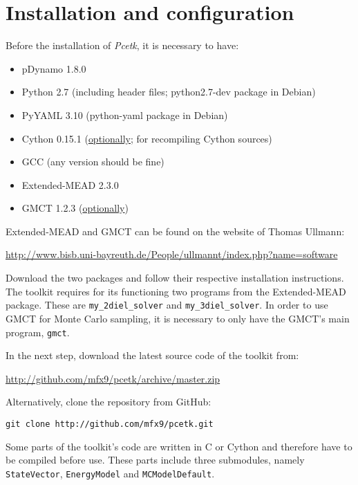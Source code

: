 \documentclass[12pt]{article}
\newcommand{\modulename}{\textit{Pcetk}\xspace}
\begin{document}
\section{Installation and configuration}
Before the installation of \modulename, it is necessary
to have:
\begin{itemize}
\itemsep0pt
  \item pDynamo 1.8.0
  \item Python 2.7 (including header files; python2.7-dev package in Debian)
  \item PyYAML 3.10 (python-yaml package in Debian)
  \item Cython 0.15.1 (\underline{optionally}; for recompiling Cython sources)
  \item GCC (any version should be fine)
  \item Extended-MEAD 2.3.0
  \item GMCT 1.2.3 (\underline{optionally})
\end{itemize}
%
Extended-MEAD and GMCT can be found on the website of Thomas Ullmann:

\url{http://www.bisb.uni-bayreuth.de/People/ullmannt/index.php?name=software}

Download the two packages and follow their respective installation
instructions.
%
The toolkit requires for its functioning two programs
from the Extended-MEAD package.
%
These are \texttt{my\_2diel\_solver} and \texttt{my\_3diel\_solver}.
%
In order to use GMCT for Monte Carlo sampling,
it is necessary to only have the
GMCT's main program, \texttt{gmct}.

\bigskip
In the next step,
download the latest source code of the toolkit from:

\url{http://github.com/mfx9/pcetk/archive/master.zip}

Alternatively,
clone the repository from GitHub:
%

{\footnotesize \singlespacing \begin{lstlisting}
git clone http://github.com/mfx9/pcetk.git
\end{lstlisting} }

\bigskip
Some parts of the toolkit's code are written in C or Cython and therefore have
to be compiled before use.
%
These parts include three submodules,
namely {\tt StateVector}, {\tt EnergyModel} and {\tt MCModelDefault}.
\end{document}
